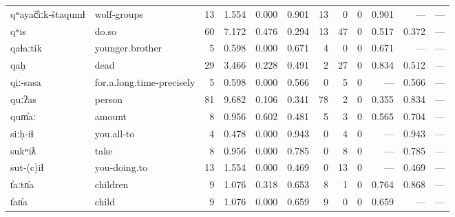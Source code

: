 \begin{landscape}
\begin{longtable}[c]{ l l | r r c c | r r r | r r r }
  qʷayač̓iːk‑štaqumɬ  & wolf‑groups               & 13  & 1.554                     & 0.000           & 0.901      & 13        & 0           & 0            & 0.901     & —           & —\\
  qʷis               & do.so                     & 60  & 7.172                     & 0.476           & 0.294      & 13        & 47          & 0            & 0.517     & 0.372       & —\\
  qaɬaːtik           & younger.brother           & 5   & 0.598                     & 0.000           & 0.671      & 4         & 0           & 0            & 0.671     & —           & —\\
  qaḥ                & dead                      & 29  & 3.466                     & 0.228           & 0.491      & 2         & 27          & 0            & 0.834     & 0.512       & —\\
  qiː‑sasa           & for.a.long.time‑precisely & 5   & 0.598                     & 0.000           & 0.566      & 0         & 5           & 0            & —         & 0.566       & —\\
  quːʔas             & person                    & 81  & 9.682                     & 0.106           & 0.341      & 78        & 2           & 0            & 0.355     & 0.834       & —\\
  qum̓aː              & amount                    & 8   & 0.956                     & 0.602           & 0.481      & 5         & 3           & 0            & 0.565     & 0.704       & —\\
  siːḥ‑iɬ            & you.all‑to                & 4   & 0.478                     & 0.000           & 0.943      & 0         & 4           & 0            & —         & 0.943       & —\\
  sukʷiƛ             & take                      & 8   & 0.956                     & 0.000           & 0.785      & 0         & 8           & 0            & —         & 0.785       & —\\
  sut‑(c)iɬ          & you‑doing.to              & 13  & 1.554                     & 0.000           & 0.469      & 0         & 13          & 0            & —         & 0.469       & —\\
  t̓aːtn̓a             & children                  & 9   & 1.076                     & 0.318           & 0.653      & 8         & 1           & 0            & 0.764     & 0.868       & —\\
  t̓an̓a               & child                     & 9   & 1.076                     & 0.000           & 0.659      & 9         & 0           & 0            & 0.659     & —           & —\\

\end{longtable}
\end{landscape}
